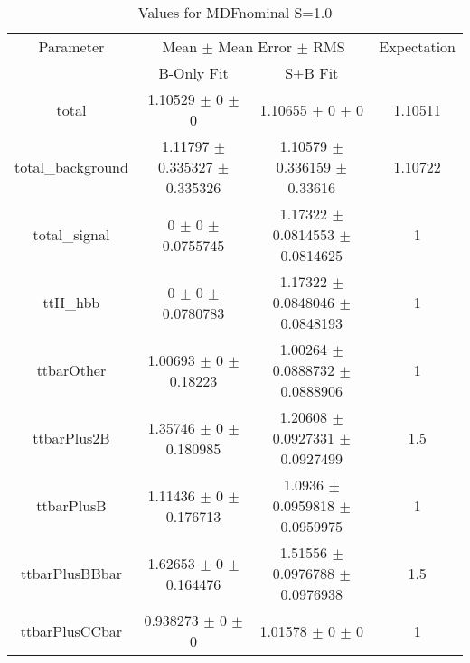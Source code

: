 \begin{table}
\centering
\caption{Values for MDFnominal S=1.0}
\begin{tabular}{cccc}
\toprule
Parameter & \multicolumn{2}{c}{Mean $\pm$ Mean Error $\pm$ RMS} & Expectation\\
 & B-Only Fit & S+B Fit & \\
\midrule
total & \num{1.10529} $\pm$ \num{0} $\pm$ \num{0} & \num{1.10655} $\pm$ \num{0} $\pm$ \num{0} & \num{1.10511}\\
total\_background & \num{1.11797} $\pm$ \num{0.335327} $\pm$ \num{0.335326} & \num{1.10579} $\pm$ \num{0.336159} $\pm$ \num{0.33616} & \num{1.10722}\\
total\_signal & \num{0} $\pm$ \num{0} $\pm$ \num{0.0755745} & \num{1.17322} $\pm$ \num{0.0814553} $\pm$ \num{0.0814625} & \num{1}\\
ttH\_hbb & \num{0} $\pm$ \num{0} $\pm$ \num{0.0780783} & \num{1.17322} $\pm$ \num{0.0848046} $\pm$ \num{0.0848193} & \num{1}\\
ttbarOther & \num{1.00693} $\pm$ \num{0} $\pm$ \num{0.18223} & \num{1.00264} $\pm$ \num{0.0888732} $\pm$ \num{0.0888906} & \num{1}\\
ttbarPlus2B & \num{1.35746} $\pm$ \num{0} $\pm$ \num{0.180985} & \num{1.20608} $\pm$ \num{0.0927331} $\pm$ \num{0.0927499} & \num{1.5}\\
ttbarPlusB & \num{1.11436} $\pm$ \num{0} $\pm$ \num{0.176713} & \num{1.0936} $\pm$ \num{0.0959818} $\pm$ \num{0.0959975} & \num{1}\\
ttbarPlusBBbar & \num{1.62653} $\pm$ \num{0} $\pm$ \num{0.164476} & \num{1.51556} $\pm$ \num{0.0976788} $\pm$ \num{0.0976938} & \num{1.5}\\
ttbarPlusCCbar & \num{0.938273} $\pm$ \num{0} $\pm$ \num{0} & \num{1.01578} $\pm$ \num{0} $\pm$ \num{0} & \num{1}\\
\bottomrule
\end{tabular}
\end{table}
